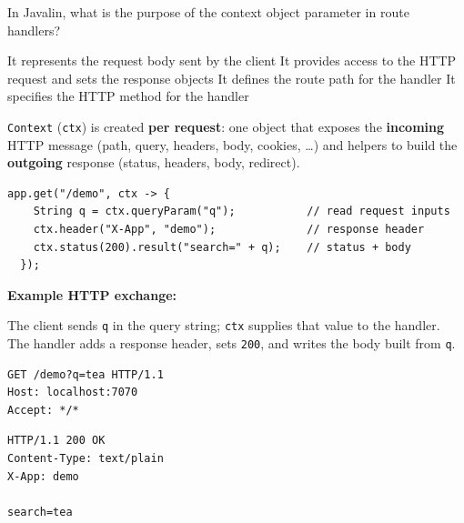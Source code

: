 \question[4]
In Javalin, what is the purpose of the context object parameter in route handlers?
\begin{choices}
  \choice It represents the request body sent by the client
  \CorrectChoice It provides access to the HTTP request and sets the response objects
  \choice It defines the route path for the handler
  \choice It specifies the HTTP method for the handler
\end{choices}
\begin{solution}
  \texttt{Context} (\texttt{ctx}) is created \textbf{per request}: one object that exposes the \textbf{incoming} HTTP message (path, query, headers, body, cookies, \ldots) and helpers to build the \textbf{outgoing} response (status, headers, body, redirect).

  \begin{lstlisting}[style=javaexam]
  app.get("/demo", ctx -> {
    String q = ctx.queryParam("q");           // read request inputs
    ctx.header("X-App", "demo");              // response header
    ctx.status(200).result("search=" + q);    // status + body
  });
  \end{lstlisting}

  \noindent\textbf{Example HTTP exchange:}\par
  \noindent The client sends \texttt{q} in the query string; \texttt{ctx} supplies that value to the handler. The handler adds a response header, sets \texttt{200}, and writes the body built from \texttt{q}.\par
  \begin{httpexchange}
\begin{lstlisting}[style=http]
GET /demo?q=tea HTTP/1.1
Host: localhost:7070
Accept: */*

\end{lstlisting}
\httpmidarrows
\begin{lstlisting}[style=http]
HTTP/1.1 200 OK
Content-Type: text/plain
X-App: demo

search=tea
\end{lstlisting}
  \end{httpexchange}
\end{solution}

\newpage

